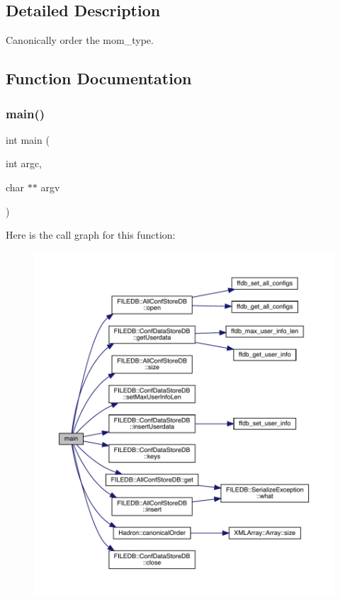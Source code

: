 \subsection{Detailed Description}
Canonically order the mom\+\_\+type. 



\subsection{Function Documentation}
\mbox{\label{adat-devel_2main_2dbutil_2dbcanon__mom_8cc_a3c04138a5bfe5d72780bb7e82a18e627}} 
\subsubsection{\texorpdfstring{main()}{main()}}
{\footnotesize\ttfamily int main (\begin{DoxyParamCaption}\item[{int}]{argc,  }\item[{char $\ast$$\ast$}]{argv }\end{DoxyParamCaption})}

Here is the call graph for this function\+:
\nopagebreak
\begin{figure}[H]
\begin{center}
\leavevmode
\includegraphics[width=350pt]{d5/dd1/adat-devel_2main_2dbutil_2dbcanon__mom_8cc_a3c04138a5bfe5d72780bb7e82a18e627_cgraph}
\end{center}
\end{figure}
